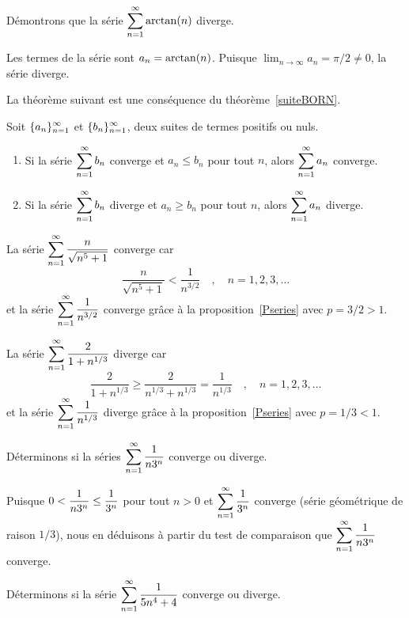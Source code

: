 {\begin{egg}
Démontrons que la série
$\displaystyle \sum_{n=1}^\infty \arctan(n)$ diverge.

Les termes de la série sont $\displaystyle a_n = \arctan(n)$.
Puisque $\lim_{n\rightarrow \infty} a_n = \pi/2 \neq 0$, la série diverge.
\end{egg}

La théorème suivant est une conséquence du théorème~\ref{suiteBORN}.

\begin{theorem} \label{comp_theo}
Soit $\displaystyle \{a_n\}_{n=1}^\infty$ et
$\displaystyle \{b_n\}_{n=1}^\infty$, deux suites de termes positifs
ou nuls.
\begin{enumerate}
\item Si la série $\displaystyle \sum_{n=1}^\infty b_n$ converge et
$a_n\leq b_n$ pour tout $n$, alors $\displaystyle \sum_{n=1}^\infty a_n$
converge.
\item Si la série $\displaystyle \sum_{n=1}^\infty b_n$ diverge et
$a_n\geq b_n$ pour tout $n$, alors $\displaystyle \sum_{n=1}^\infty a_n$
diverge.
\end{enumerate}
\end{theorem}

\begin{egg}
La série $\displaystyle \sum_{n=1}^\infty \frac{n}{\sqrt{n^5+1}}$
converge car
\[
\frac{n}{\sqrt{n^5+1}} < \frac{1}{n^{3/2}} \quad , \quad n=1,2,3,\ldots
\]
et la série $\displaystyle \sum_{n=1}^\infty \frac{1}{n^{3/2}}$
converge grâce à la proposition~\ref{Pseries} avec $p = 3/2 > 1$.

La série $\displaystyle \sum_{n=1}^\infty \frac{2}{1+n^{1/3}}$ diverge car
\[
\frac{2}{1+n^{1/3}} \geq \frac{2}{n^{1/3}+n^{1/3}} =\frac{1}{n^{1/3}}
\quad , \quad n=1, 2, 3,\ldots
\]
et la série $\displaystyle \sum_{n=1}^\infty \frac{1}{n^{1/3}}$ diverge grâce
à la proposition~\ref{Pseries} avec $p =1/3 < 1$.
\end{egg}

\begin{egg}
Déterminons si la séries $\displaystyle \sum_{n=1}^\infty \frac{1}{n 3^n}$
converge ou diverge.

Puisque $\displaystyle 0 < \frac{1}{n 3^n} \leq \frac{1}{3^n}$
pour tout $n>0$ et $\displaystyle \sum_{n=1}^\infty \frac{1}{3^n}$
converge (série géométrique de raison $1/3$), nous en déduisons à partir du
test de comparaison que $\displaystyle \sum_{n=1}^\infty \frac{1}{n 3^n}$
converge.
\end{egg}

\begin{egg}
Déterminons si la série $\displaystyle \sum_{n=1}^\infty \frac{1}{5n^4 + 4}$
converge ou diverge.


\end{egg}}

